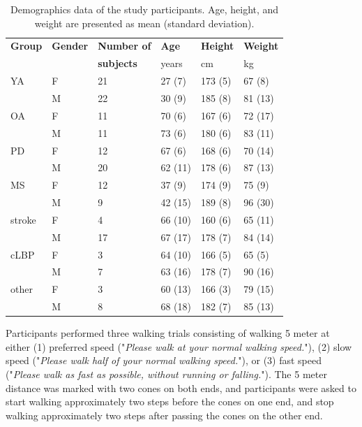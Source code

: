 \documentclass[sensors,article,submit,pdftex,moreauthors]{Definitions/mdpi}
\begin{document}
\begin{table}[H] 
	\caption{\label{tab:demographics_data}Demographics data of the study participants. Age, height, and weight are presented as mean (standard deviation).}
	\begin{tabularx}{\textwidth}{CCCCCC}
		\toprule
		\textbf{Group}	& \textbf{Gender}	& \textbf{Number of}	& \textbf{Age}	& \textbf{Height}	& \textbf{Weight}\\
		 & & \textbf{subjects} & years	& cm	& kg\\
		\midrule
		YA		& F		& 21	& 27 (7)	& 173 (5)	& 67 (8)\\
		 & M	& 22	& 30 (9)	& 185 (8) & 81 (13)\\ 
		\midrule
		OA		& F		& 11	& 70 (6)	& 167 (6)	& 72 (17)\\
		 & M	& 11	& 73 (6)	& 180 (6) & 83 (11)\\
		\midrule
		PD		& F		& 12	& 67 (6)	& 168 (6)	& 70 (14)\\
		 & M	& 20	& 62 (11)	& 178 (6) & 87 (13)\\
		\midrule
		MS		& F		& 12	& 37 (9)	& 174 (9)	& 75 (9)\\
		 & M	& 9	& 42 (15)	& 189 (8) & 96 (30)\\
		\midrule
		stroke	& F		& 4	& 66 (10)	& 160 (6)	& 65 (11)\\
		 & M	& 17	& 67 (17)	& 178 (7) & 84 (14)\\
		\midrule
		cLBP	& F		& 3	& 64 (10)	& 166 (5)	& 65 (5)\\
		 & M	& 7	& 63 (16)	& 178 (7) & 90 (16)\\ 
		\midrule
		other	& F		& 3	& 60 (13)	& 166 (3)	& 79 (15)\\
		 & M	& 8	& 68 (18)	& 182 (7) & 85 (13)\\ 
		\bottomrule
	\end{tabularx}
\end{table}

Participants performed three walking trials consisting of walking 5 meter at either (1) preferred speed ("\emph{Please walk at your normal walking speed.}"), (2) slow speed ("\emph{Please walk half of your normal walking speed.}"), or (3) fast speed ("\emph{Please walk as fast as possible, without running or falling.}"). The 5 meter distance was marked with two cones on both ends, and participants were asked to start walking approximately two steps before the cones on one end, and stop walking approximately two steps after passing the cones on the other end.
\end{document}
